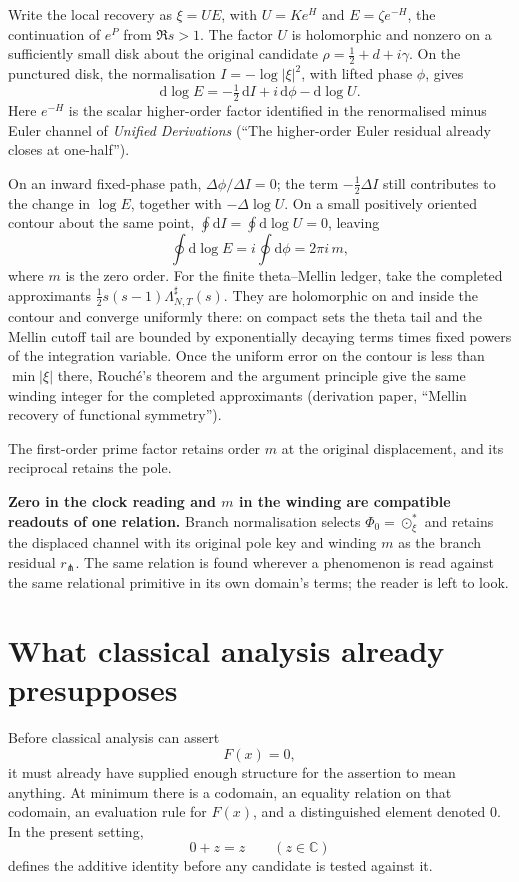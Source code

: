 \documentclass[11pt]{article}
\begin{document}
Write the local recovery as \(\xi=UE\), with \(U=K e^H\) and \(E=\zeta e^{-H}\), the continuation of \(e^P\) from \(\Re s>1\). The factor \(U\) is holomorphic and nonzero on a sufficiently small disk about the original candidate \(\rho=\tfrac12+d+i\gamma\). On the punctured disk, the normalisation \(I=-\log|\xi|^2\), with lifted phase \(\phi\), gives
\[
\boxed{\mathrm{d}\log E=-\tfrac12\,\mathrm{d}I
+i\,\mathrm{d}\phi-\mathrm{d}\log U.}
\]
Here \(e^{-H}\) is the scalar higher-order factor identified in the renormalised minus Euler channel of \emph{Unified Derivations} (``The higher-order Euler residual already closes at one-half'').

On an inward fixed-phase path, \(\Delta\phi/\Delta I=0\); the term \(-\tfrac12\Delta I\) still contributes to the change in \(\log E\), together with \(-\Delta\log U\). On a small positively oriented contour about the same point, \(\oint\mathrm{d}I=\oint\mathrm{d}\log U=0\), leaving
\[
\boxed{\oint\mathrm{d}\log E=i\oint\mathrm{d}\phi=2\pi i\,m,}
\]
where \(m\) is the zero order. For the finite theta--Mellin ledger, take the completed approximants \(\tfrac12s(s-1)\Lambda^\sharp_{N,T}(s)\). They are holomorphic on and inside the contour and converge uniformly there: on compact sets the theta tail and the Mellin cutoff tail are bounded by exponentially decaying terms times fixed powers of the integration variable. Once the uniform error on the contour is less than \(\min|\xi|\) there, Rouch\'e's theorem and the argument principle give the same winding integer for the completed approximants (derivation paper, ``Mellin recovery of functional symmetry'').

The first-order prime factor retains order \(m\) at the original displacement, and its reciprocal retains the pole.

\textbf{Zero in the clock reading and \(m\) in the winding are compatible readouts of one relation.} Branch normalisation selects \(\Phi_0=\odot_\xi^\ast\) and retains the displaced channel with its original pole key and winding \(m\) as the branch residual \(r_{\pitchfork}\). The same relation is found wherever a phenomenon is read against the same relational primitive in its own domain's terms; the reader is left to look.

\section{What classical analysis already presupposes}

Before classical analysis can assert
\[
F(x)=0,
\]
it must already have supplied enough structure for the assertion to mean anything. At minimum there is a codomain, an equality relation on that codomain, an evaluation rule for \(F(x)\), and a distinguished element denoted \(0\). In the present setting,
\[
0+z=z
\qquad
(z\in\mathbb C)
\]
defines the additive identity before any candidate is tested against it.
\end{document}
